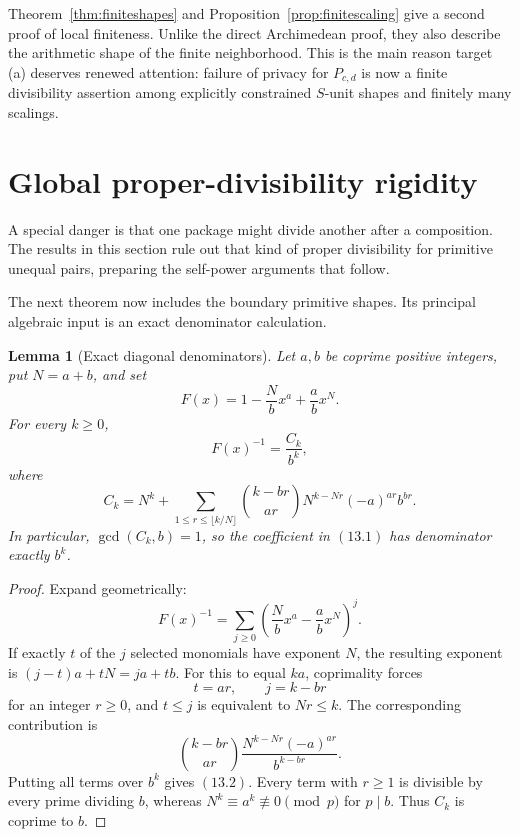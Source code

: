 \documentclass[11pt]{article}
\newtheorem{lemma}[theorem]{Lemma}
\theoremstyle{definition}
\begin{document}
Theorem~\ref{thm:finiteshapes} and Proposition~\ref{prop:finitescaling}
give a second proof of local finiteness.  Unlike the direct Archimedean proof,
they also describe the arithmetic shape of the finite neighborhood.  This is
the main reason target (a) deserves renewed attention: failure of privacy for
\(P_{c,d}\) is now a finite divisibility assertion among explicitly
constrained \(S\)-unit shapes and finitely many scalings.

\section{Global proper-divisibility rigidity}

A special danger is that one package might divide another after a composition.  The results in this section rule out that kind of proper divisibility for primitive unequal pairs, preparing the self-power arguments that follow.
\label{sec:nodivision}

The next theorem now includes the boundary primitive shapes.  Its principal
algebraic input is an exact denominator calculation.

\begin{lemma}[Exact diagonal denominators]\label{lem:diagonaldenominator}
Let \(a,b\) be coprime positive integers, put \(N=a+b\), and set
\[
 F(x)=1-\frac Nb x^a+\frac ab x^N.
\]
For every \(k\geq0\),
\begin{equation}
 [x^{ka}]F(x)^{-1}=\frac{C_k}{b^k},
 \tag{13.1}
\end{equation}
where
\begin{equation}
 C_k=N^k+
 \sum_{1\leq r\leq\lfloor k/N\rfloor}
 \binom{k-br}{ar}N^{k-Nr}(-a)^{ar}b^{br}.
 \tag{13.2}
\end{equation}
In particular, \(\gcd(C_k,b)=1\), so the coefficient in \((13.1)\) has
denominator exactly \(b^k\).
\end{lemma}

\begin{proof}
Expand geometrically:
\[
 F(x)^{-1}=\sum_{j\geq0}
 \left(\frac Nb x^a-\frac ab x^N\right)^j.
\]
If exactly \(t\) of the \(j\) selected monomials have exponent \(N\), the
resulting exponent is \((j-t)a+tN=ja+tb\).  For this to equal \(ka\),
coprimality forces
\[
 t=ar,\qquad j=k-br
\]
for an integer \(r\geq0\), and \(t\leq j\) is equivalent to \(Nr\leq k\).
The corresponding contribution is
\[
 \binom{k-br}{ar}\frac{N^{k-Nr}(-a)^{ar}}{b^{k-br}}.
\]
Putting all terms over \(b^k\) gives \((13.2)\).  Every term with \(r\geq1\)
is divisible by every prime dividing \(b\), whereas
\(N^k\equiv a^k\not\equiv0\pmod p\) for \(p\mid b\).  Thus \(C_k\) is
coprime to \(b\).
\end{proof}
\end{document}
